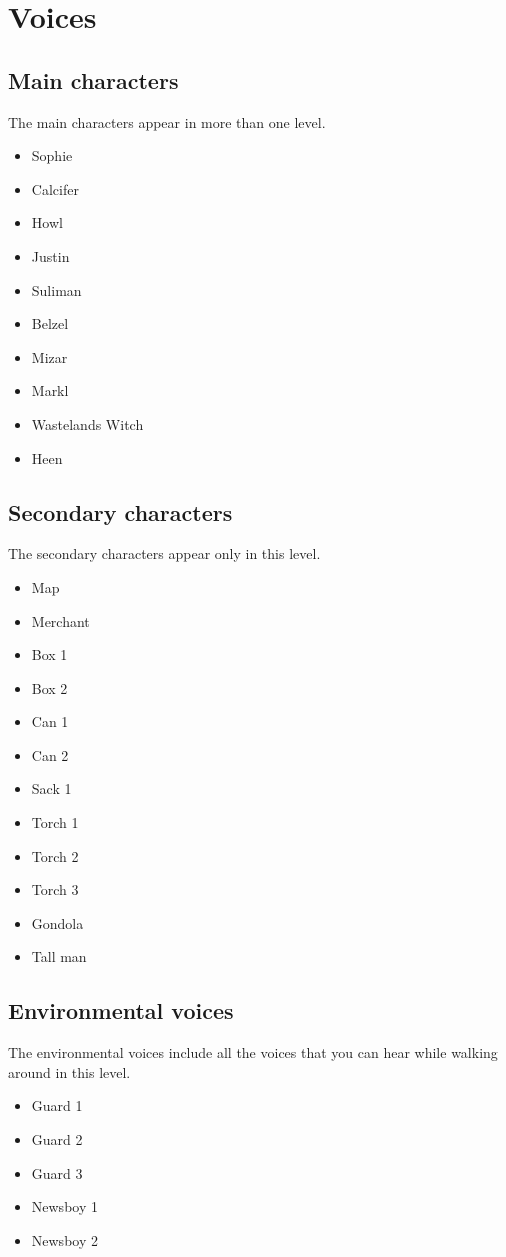 \section{Voices}

\subsection{Main characters}
The main characters appear in more than one level.
\begin{itemize}
	\item Sophie
	\item Calcifer
	\item Howl
	\item Justin
	\item Suliman
	\item Belzel
	\item Mizar
	\item Markl
	\item Wastelands Witch
	\item Heen
\end{itemize}

\subsection{Secondary characters}
The secondary characters appear only in this level.
\begin{itemize}
	\item Map
	\item Merchant
	\item Box 1
	\item Box 2
	\item Can 1
	\item Can 2
	\item Sack 1
	\item Torch 1
	\item Torch 2
	\item Torch 3
	\item Gondola
	\item Tall man
\end{itemize}

\subsection{Environmental voices}
The environmental voices include all the voices that you can hear while walking around in this level.
\begin{itemize}
	\item Guard 1
	\item Guard 2
	\item Guard 3
	\item Newsboy 1
	\item Newsboy 2
\end{itemize}
